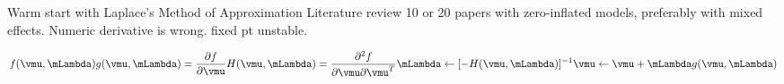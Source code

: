 \documentclass{amsart}
\begin{document}
Warm start with Laplace's Method of Approximation
Literature review
10 or 20 papers with zero-inflated models, preferably with mixed effects.
Numeric derivative is wrong.
fixed pt unstable.

\begin{align*}
f(\vmu, \mLambda)
g(\vmu, \mLambda) = \frac{\partial f}{\partial \vmu}
H(\vmu, \mLambda) = \frac{\partial^2 f}{\partial \vmu \partial \vmu^T}
\mLambda \leftarrow [-H(\vmu, \mLambda)]^{-1}
\vmu \leftarrow \vmu + \mLambda g(\vmu, \mLambda)
\end{align*}
\end{document}

